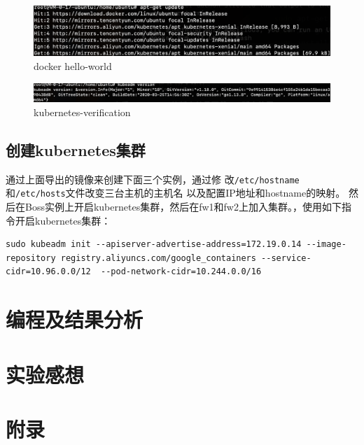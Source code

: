 \documentclass{article}
\begin{document}
\hfill
\begin{minipage}{0.45\textwidth}
    \begin{figure}[H]
        \centering
        \includegraphics[width=1.0\textwidth]{changeorigin.png}
        \caption{docker hello-world}
        \label{fig:helloworld}
    \end{figure}
    \begin{figure}[H]
        \centering
        \includegraphics[width=1.0\textwidth]{kubernetesverify.png}
        \caption{kubernetes-verification}
        \label{fig:kubernetesverification}
    \end{figure}
\end{minipage}

\subsection{创建kubernetes集群}
\indent 通过上面导出的镜像来创建下面三个实例，通过修
改\texttt{/etc/hostname}和\texttt{/etc/hosts}文件改变三台主机的主机名
以及配置IP地址和hostname的映射。
然后在Boss实例上开启kubernetes集群，然后在fw1和fw2上加入集群。，使用如下指令开启kubernetes集群：
\begin{lstlisting}[style=bashstyle]
sudo kubeadm init --apiserver-advertise-address=172.19.0.14 --image-repository registry.aliyuncs.com/google_containers --service-cidr=10.96.0.0/12  --pod-network-cidr=10.244.0.0/16
\end{lstlisting}
\section{编程及结果分析}
\section{实验感想}
\newpage
\appendix
\section{附录}
\end{document}
